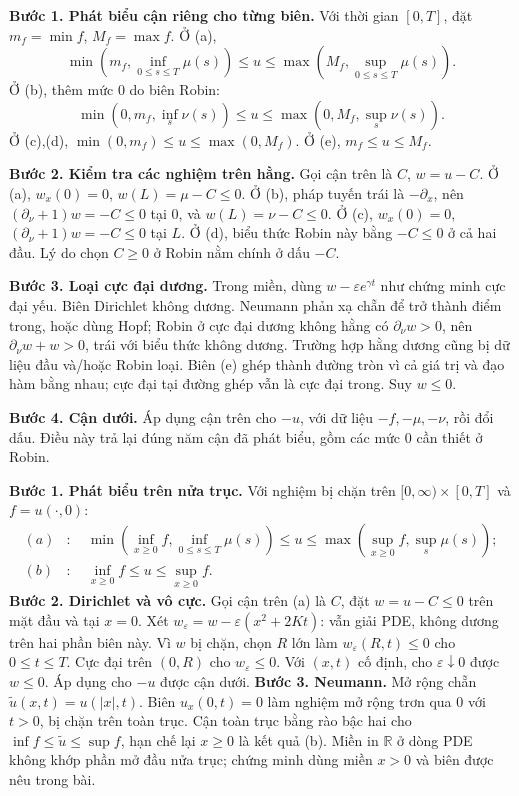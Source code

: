 \textbf{Bước 1. Phát biểu cận riêng cho từng biên.} Với thời gian $[0,T]$, đặt $m_f=\min f$, $M_f=\max f$. Ở (a),
\[\min(m_f,\inf_{0\le s\le T}\mu(s))\le u\le
\max(M_f,\sup_{0\le s\le T}\mu(s)).\]
Ở (b), thêm mức $0$ do biên Robin:
\[\min(0,m_f,\inf_s\nu(s))\le u\le\max(0,M_f,\sup_s\nu(s)).\]
Ở (c),(d), $\min(0,m_f)\le u\le\max(0,M_f)$. Ở (e), $m_f\le u\le M_f$.

\textbf{Bước 2. Kiểm tra các nghiệm trên hằng.} Gọi cận trên là $C$, $w=u-C$. Ở (a), $w_x(0)=0$, $w(L)=\mu-C\le0$. Ở (b), pháp tuyến trái là $-\partial_x$, nên $(\partial_\nu+1)w=-C\le0$ tại $0$, và $w(L)=\nu-C\le0$. Ở (c), $w_x(0)=0$, $(\partial_\nu+1)w=-C\le0$ tại $L$. Ở (d), biểu thức Robin này bằng $-C\le0$ ở cả hai đầu. Lý do chọn $C\ge0$ ở Robin nằm chính ở dấu $-C$.

\textbf{Bước 3. Loại cực đại dương.} Trong miền, dùng $w-\varepsilon e^{\gamma t}$ như chứng minh cực đại yếu. Biên Dirichlet không dương. Neumann phản xạ chẵn để trở thành điểm trong, hoặc dùng Hopf; Robin ở cực đại dương không hằng có $\partial_\nu w>0$, nên $\partial_\nu w+w>0$, trái với biểu thức không dương. Trường hợp hằng dương cũng bị dữ liệu đầu và/hoặc Robin loại. Biên (e) ghép thành đường tròn vì cả giá trị và đạo hàm bằng nhau; cực đại tại đường ghép vẫn là cực đại trong. Suy $w\le0$.

\textbf{Bước 4. Cận dưới.} Áp dụng cận trên cho $-u$, với dữ liệu $-f,-\mu,-\nu$, rồi đổi dấu. Điều này trả lại đúng năm cận đã phát biểu, gồm các mức $0$ cần thiết ở Robin.

\textbf{Bước 1. Phát biểu trên nửa trục.} Với nghiệm bị chặn trên $[0,\infty)\times[0,T]$ và $f=u(\cdot,0)$:
\begin{align*}
(a)&:\quad \min(\inf_{x\ge0}f,\inf_{0\le s\le T}\mu(s))
\le u\le\max(\sup_{x\ge0}f,\sup_s\mu(s));\\
(b)&:\quad \inf_{x\ge0}f\le u\le\sup_{x\ge0}f.
\end{align*}
\textbf{Bước 2. Dirichlet và vô cực.} Gọi cận trên (a) là $C$, đặt $w=u-C\le0$ trên mặt đầu và tại $x=0$. Xét $w_\varepsilon=w-\varepsilon(x^2+2Kt)$: vẫn giải PDE, không dương trên hai phần biên này. Vì $w$ bị chặn, chọn $R$ lớn làm $w_\varepsilon(R,t)\le0$ cho $0\le t\le T$. Cực đại trên $(0,R)$ cho $w_\varepsilon\le0$. Với $(x,t)$ cố định, cho $\varepsilon\downarrow0$ được $w\le0$. Áp dụng cho $-u$ được cận dưới.
\textbf{Bước 3. Neumann.} Mở rộng chẵn $\widetilde u(x,t)=u(|x|,t)$. Biên $u_x(0,t)=0$ làm nghiệm mở rộng trơn qua $0$ với $t>0$, bị chặn trên toàn trục. Cận toàn trục bằng rào bậc hai cho $\inf f\le\widetilde u\le\sup f$, hạn chế lại $x\ge0$ là kết quả (b).
Miền in $\mathbb R$ ở dòng PDE không khớp phần mở đầu nửa trục; chứng minh dùng miền $x>0$ và biên được nêu trong bài.

